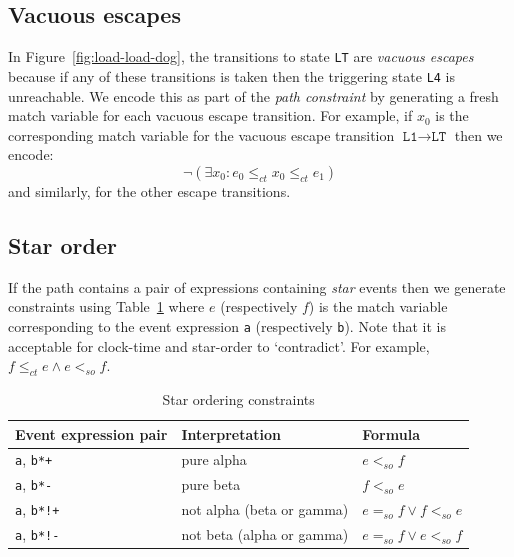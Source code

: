 \documentclass[10pt]{paper}
\newcommand{\state}[1]{\texttt{#1}}
\begin{document}
\subsection{Vacuous escapes}
%
In Figure~\ref{fig:load-load-dog}, the transitions to state \state{LT} are \emph{vacuous escapes} because if any of these transitions is taken then the triggering state \state{L4} is unreachable.
%
We encode this as part of the \emph{path constraint} by generating a fresh match variable for each vacuous escape transition.
%
For example, if $x_0$ is the corresponding match variable for the vacuous escape transition $\state{L1} \rightarrow \state{LT}$ then we encode:
\[
\neg (\exists x_0 : e_0 \leq_{ct} x_0 \leq_{ct} e_1)
\]
%
and similarly, for the other escape transitions.

\subsection{Star order}
%
If the path contains a pair of expressions containing \emph{star} events then we generate constraints using Table~\ref{table:star} where $e$ (respectively $f$) is the match variable corresponding to the event expression \texttt{a} (respectively \texttt{b}).
%
Note that it is acceptable for clock-time and star-order to `contradict'.
%
For example, $f \leq_{ct} e \wedge e <_{so} f$.

\begin{table}[h]
\caption{Star ordering constraints}
\label{table:star}
\begin{tabular}{lll}
\toprule
\textbf{Event expression pair} & \textbf{Interpretation}   & \textbf{Formula} \\
\midrule
\texttt{a}, \texttt{b*+}       & pure alpha                & $e <_{so} f$ \\
\texttt{a}, \texttt{b*-}       & pure beta                 & $f <_{so} e$ \\
\texttt{a}, \texttt{b*!+}      & not alpha (beta or gamma) & $e =_{so} f \vee f <_{so} e$ \\
\texttt{a}, \texttt{b*!-}      & not beta (alpha or gamma) & $e =_{so} f \vee e <_{so} f$ \\
\bottomrule
\end{tabular}
\end{table}
\end{document}
